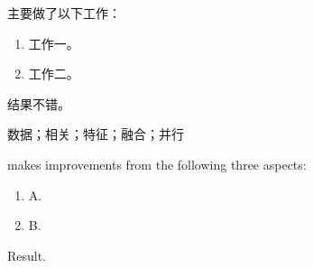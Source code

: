 
\setcounter{page}{1}

{
    \linespread{1.28} \selectfont
    { \song
        主要做了以下工作：

        \begin{enumerate}[fullwidth,itemindent=\parindent]
            \item 工作一。
            \item 工作二。
        \end{enumerate}

        结果不错。

    }
}

\vspace{\baselineskip}
{\hei {} } {\song {}
    数据；相关；特征；融合；并行
}
\clearpage


{
    \linespread{1.28} \selectfont
    { \song
        makes improvements from the following three aspects:

        \begin{enumerate}[fullwidth,itemindent=\parindent]
            \item A.
            \item B.
        \end{enumerate}

        Result.

    }
}

\vspace{\baselineskip}
{\hei {} }

\clearpage{\pagestyle{empty}\cleardoublepage}%

